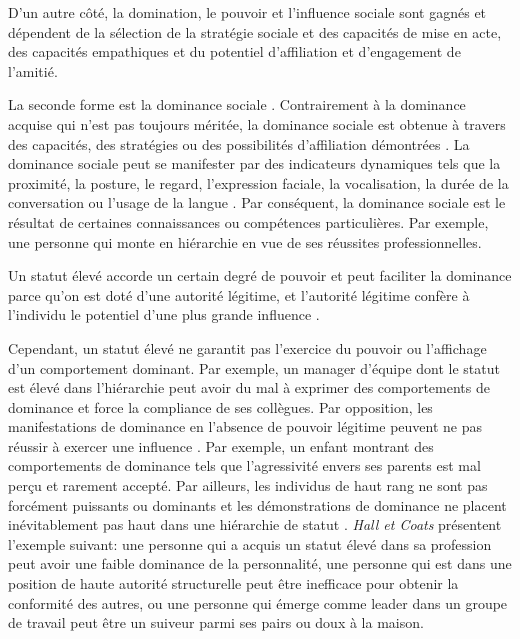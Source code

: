  	D'un autre côté, la domination, le pouvoir et l'influence sociale sont gagnés et dépendent de la sélection de la stratégie sociale et des capacités de mise en acte, des capacités empathiques et du potentiel d'affiliation et d'engagement de l'amitié.
	
	La seconde forme est la dominance sociale \cite{liska1990dominance}. Contrairement à la dominance acquise qui n'est pas toujours méritée, la dominance sociale est obtenue à travers des capacités, des stratégies ou des possibilités d'affiliation démontrées \cite{burgoon1998nature}.  La dominance sociale peut se manifester par des indicateurs dynamiques tels que la proximité, la posture, le regard, l'expression faciale, la vocalisation, la durée de la conversation ou l'usage de la langue \cite{keating1985human}. Par conséquent, la dominance sociale est le résultat de certaines connaissances ou compétences particulières. Par exemple, une personne qui monte en hiérarchie en vue de ses réussites professionnelles.
		
	Un statut élevé accorde un certain degré de pouvoir et peut faciliter la dominance parce qu'on est doté d'une autorité légitime, et l'autorité légitime confère à l'individu le potentiel d'une plus grande influence \cite{burgoon2006nonverbal}. 
	
	Cependant, un statut élevé ne garantit pas l'exercice du pouvoir ou l'affichage d'un comportement dominant. Par exemple, un manager d'équipe dont le statut est élevé dans l'hiérarchie peut avoir du mal à exprimer des comportements de dominance et force la compliance de ses collègues. Par opposition, les manifestations de dominance en l'absence de pouvoir légitime peuvent ne pas réussir à exercer une influence \cite{ridgeway1995legitimacy}. Par exemple, un enfant montrant des comportements de dominance tels que l'agressivité envers ses parents est mal perçu et rarement accepté.
	Par ailleurs, les individus de haut rang ne sont pas forcément puissants ou dominants et les démonstrations de dominance ne placent inévitablement pas haut dans une hiérarchie de statut \cite{burgoonnonverbal}. \emph{Hall et Coats} \cite{hall2005nonverbal} présentent l'exemple suivant: une personne qui a acquis un statut élevé dans sa profession peut avoir une faible dominance de la personnalité, une personne qui est dans une position de haute autorité structurelle peut être inefficace pour obtenir la conformité des autres, ou une personne qui émerge comme leader dans un groupe de travail peut être un suiveur parmi ses pairs ou doux à la maison.
	
